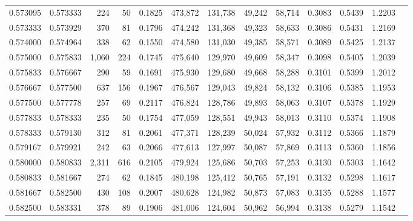 \begin{tabular}{rrrrrrrrrrrrr}
0.573095 & 0.573333 &   224 &  50 &                                     0.1825 & 473,872 & 131,738 &  49,242 &  58,714 & 0.3083 & 0.5439 & 1.2203 \\
0.573333 & 0.573929 &   370 &  81 &                                     0.1796 & 474,242 & 131,368 &  49,323 &  58,633 & 0.3086 & 0.5431 & 1.2169 \\
0.574000 & 0.574964 &   338 &  62 &                                     0.1550 & 474,580 & 131,030 &  49,385 &  58,571 & 0.3089 & 0.5425 & 1.2137 \\
0.575000 & 0.575833 & 1,060 & 224 &                                     0.1745 & 475,640 & 129,970 &  49,609 &  58,347 & 0.3098 & 0.5405 & 1.2039 \\
0.575833 & 0.576667 &   290 &  59 &                                     0.1691 & 475,930 & 129,680 &  49,668 &  58,288 & 0.3101 & 0.5399 & 1.2012 \\
0.576667 & 0.577500 &   637 & 156 &                                     0.1967 & 476,567 & 129,043 &  49,824 &  58,132 & 0.3106 & 0.5385 & 1.1953 \\
0.577500 & 0.577778 &   257 &  69 &                                     0.2117 & 476,824 & 128,786 &  49,893 &  58,063 & 0.3107 & 0.5378 & 1.1929 \\
0.577833 & 0.578333 &   235 &  50 &                                     0.1754 & 477,059 & 128,551 &  49,943 &  58,013 & 0.3110 & 0.5374 & 1.1908 \\
0.578333 & 0.579130 &   312 &  81 &                                     0.2061 & 477,371 & 128,239 &  50,024 &  57,932 & 0.3112 & 0.5366 & 1.1879 \\
0.579167 & 0.579921 &   242 &  63 &                                     0.2066 & 477,613 & 127,997 &  50,087 &  57,869 & 0.3113 & 0.5360 & 1.1856 \\
0.580000 & 0.580833 & 2,311 & 616 &                                     0.2105 & 479,924 & 125,686 &  50,703 &  57,253 & 0.3130 & 0.5303 & 1.1642 \\
0.580833 & 0.581667 &   274 &  62 &                                     0.1845 & 480,198 & 125,412 &  50,765 &  57,191 & 0.3132 & 0.5298 & 1.1617 \\
0.581667 & 0.582500 &   430 & 108 &                                     0.2007 & 480,628 & 124,982 &  50,873 &  57,083 & 0.3135 & 0.5288 & 1.1577 \\
0.582500 & 0.583331 &   378 &  89 &                                     0.1906 & 481,006 & 124,604 &  50,962 &  56,994 & 0.3138 & 0.5279 & 1.1542 \\

\end{tabular}
